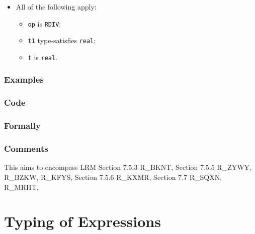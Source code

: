 \documentclass{book}
\begin{document}
\begin{itemize}
  \item All of the following apply:
    \begin{itemize}
    \item \texttt{op} is \texttt{RDIV};
    \item \texttt{t1} type-satisfies \texttt{real};
    \item \texttt{t} is \texttt{real}.
    \end{itemize}
\end{itemize}

  \subsection{Examples} 

  \subsection{Code}

  \subsection{Formally}

\subsection{Comments}
  This aims to encompass LRM Section 7.5.3 R\_BKNT, Section 7.5.5 R\_ZYWY, R\_BZKW,
  R\_KFYS, Section 7.5.6 R\_KXMR, Section 7.7 R\_SQXN, R\_MRHT.

\chapter{Typing of Expressions}
\end{document}
